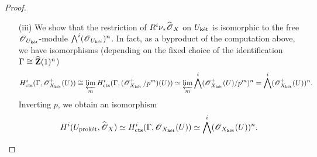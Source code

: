\begin{proof}
\begin{enumerate}
On the other hand, for every $i\in \Z_{\geq 0}$, we claim that there is a natural isomorphism
\[H_{\cts}^i(\Gamma, \scrO_{X_{\ket}}^+(U))\cong \varprojlim_m H_{\cts}^i(\Gamma, (\scrO_{X_{\ket}}^+/p^m)(U)).\] Indeed, by the same arguments as in the proof of \cite[Theorem 2.7.5]{NSW-cohomology}, there is a short exact sequence \[0\rightarrow R^1\varprojlim_{m} H_{\cts}^{i-1}(\Gamma, (\scrO_{X_{\ket}}^+/p^m)(U))\rightarrow H_{\cts}^{i}(\Gamma, \scrO_{X_{\ket}}^+(U))\rightarrow \varprojlim_m H_{\cts}^{i}(\Gamma, (\scrO_{X_{\ket}}^+/p^m)(U))\rightarrow 0.\] 
It suffices to show that 
\[R^1\varprojlim_m H_{\cts}^{i-1}(\Gamma, (\scrO_{X_{\ket}}^+/p^m)(U))=0.\] 
Notice that $P^{\mathrm{gp}}$ is a finitely generated torsion-free abelian group. By choosing a $\Z$-basis of $P^{\mathrm{gp}}$, we obtain an isomorphism $\Gamma\cong \widehat{\Z}(1)^n$ of profinite groups which induces an isomorphism
\[
H^{i-1}_{\cts}(\Gamma, (\scrO^+_{X_{\ket}}/p^m)(U))\simeq \bigwedge^{i-1}(\scrO^+_{X_{\ket}}(U)/p^m)^n.
\]
Thus, for every $m'>m$, the transition map \[H_{\cts}^{i-1}(\Gamma, (\scrO_{X_{\ket}}^+/p^{m'})(U))\rightarrow H_{\cts}^{i-1}(\Gamma, (\scrO_{X_{\ket}}^+/p^{m})(U))\] is a surjection. Hence, the inverse system $\{H_{\cts}^{i-1}(\Gamma, (\scrO_{X_{\ket}}^+/p^m)(U)): m\in \Z_{>0}\}$ satisfies the Mittag-Leffler condition which yields the desired vanishing of $R^1\lim$.

Putting everything together, we obtain a natural injection
$$
H_{\cts}^i(\Gamma, \scrO_{X_{\ket}}^+(U))^a\cong \varprojlim_m H_{\cts}^i(\Gamma, (\scrO_{X_{\ket}}^+/p^m)(U))^a\hookrightarrow \varprojlim_m H_{\cts}^i(\Gamma, (\scrO_{X}^+/p^m)(\widetilde{U}))^a\cong H^i(U_{\proket}, \widehat{\scrO}_{X}^+)^a
$$
whose cokernel is killed by $p$, as desired.

\item[(iii)] We show that the restriction of $R^i\nu_*\widehat{\operatorname{\mathscr{O}}}_X$ on $U_{\operatorname{\textrm{k\'{e}t}}}$ is isomorphic to the free $\operatorname{\mathscr{O}}_{U_{\operatorname{\textrm{k\'{e}t}}}}$-module $\bigwedge^i (\operatorname{\mathscr{O}}_{U_{\operatorname{\textrm{k\'{e}t}}}})^n$. In fact, as a byproduct of the computation above, we have isomorphisms (depending on the fixed choice of the identification $\Gamma\cong \widehat{\Z}(1)^n$)
$$H^i_{\operatorname{cts}}(\Gamma, \operatorname{\mathscr{O}}^+_{X_{\operatorname{\textrm{k\'{e}t}}}}(U))\cong \varprojlim_m H_{\operatorname{cts}}^i(\Gamma, (\operatorname{\mathscr{O}}_{X_{\operatorname{\textrm{k\'{e}t}}}}^+/p^m)(U))\simeq \varprojlim_m\bigwedge^i(\operatorname{\mathscr{O}}^+_{X_{\operatorname{\textrm{k\'{e}t}}}}(U)/p^m)^n=\bigwedge^i(\operatorname{\mathscr{O}}^+_{X_{\operatorname{\textrm{k\'{e}t}}}}(U))^n.$$
Inverting $p$, we obtain an isomorphism
$$H^i(U_{\operatorname{\textrm{prok\'{e}t}}}, \widehat{\operatorname{\mathscr{O}}}_X)\simeq H^i_{\operatorname{cts}}(\Gamma, \operatorname{\mathscr{O}}_{X_{\operatorname{\textrm{k\'{e}t}}}}(U))\simeq \bigwedge^i(\operatorname{\mathscr{O}}_{X_{\operatorname{\textrm{k\'{e}t}}}}(U))^n.$$


\end{enumerate}
\end{proof}
